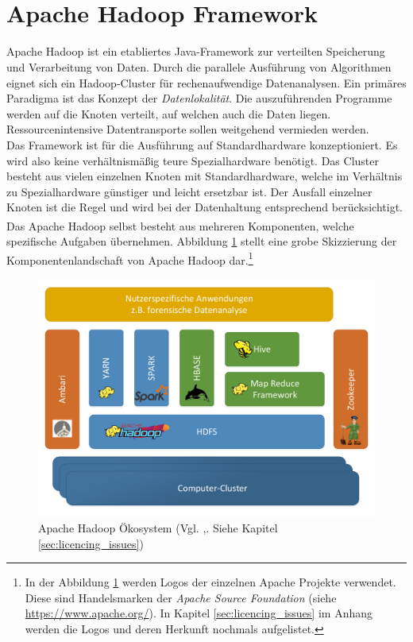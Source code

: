 \section{Apache Hadoop\textsuperscript{\textregistered} Framework}
\label{sec:theory_hadoop}
\noindent
Apache Hadoop ist ein etabliertes Java-Framework zur verteilten Speicherung und Verarbeitung von Daten. Durch die parallele Ausführung von Algorithmen eignet sich ein Hadoop-Cluster für rechenaufwendige Datenanalysen. Ein primäres Paradigma ist das Konzept der \textit{Datenlokalität}. Die auszuführenden Programme werden auf die Knoten verteilt, auf welchen auch die Daten liegen. Ressourcenintensive Datentransporte sollen weitgehend vermieden werden.\cite[S. 20 ff.]{big_data_praxis}\\ 
Das Framework ist für die Ausführung auf Standardhardware konzeptioniert. Es wird also keine verhältnismäßig teure Spezialhardware benötigt. Das Cluster besteht aus vielen einzelnen Knoten mit Standardhardware, welche im Verhältnis zu Spezialhardware günstiger und leicht ersetzbar ist. Der Ausfall einzelner Knoten ist die Regel und wird bei der Datenhaltung entsprechend berücksichtigt. \\

\noindent
Das Apache Hadoop\textsuperscript{\textregistered} selbst besteht aus mehreren Komponenten, welche spezifische Aufgaben übernehmen. Abbildung \ref{fig:hadoop_framework_structure} stellt eine grobe Skizzierung der Komponentenlandschaft von Apache Hadoop dar.\footnote{In der Abbildung \ref{fig:hadoop_framework_structure} werden Logos der einzelnen Apache Projekte verwendet. Diese sind Handelsmarken der \textit{Apache Source Foundation} (siehe \url{https://www.apache.org/}). In Kapitel \ref{sec:licencing_issues} im Anhang werden die Logos und deren Herkunft nochmals aufgelistet.}\\

\begin{figure}[ht]
  \centering
  \includegraphics[width=\textwidth]{./resource/hadoop_framework_structure.pdf}
  \caption{Apache Hadoop Ökosystem (Vgl. \cite{big_data_praxis},\cite{expert_hadoop_admin}. Siehe Kapitel \ref{sec:licencing_issues})}
  \label{fig:hadoop_framework_structure}
\end{figure}

